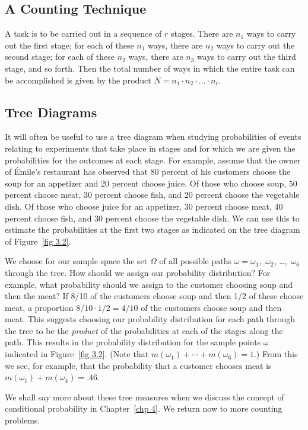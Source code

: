 
\subsection*{A Counting Technique}

A task is to be carried out in a sequence of $r$ stages.  There are $n_1$ ways to
carry out the first stage; for each of these $n_1$ ways, there are $n_2$ ways to carry
out the second stage; for each of these $n_2$ ways, there are
$n_3$ ways to carry out the third stage, and so forth.  Then the total number of ways
in which the entire task can be accomplished is given by the product
$N = n_1 \cdot n_2 \cdot \dots \cdot n_r$.

 
\subsection*{Tree Diagrams}

It will often be useful to use a tree diagram when studying probabilities of events
relating to experiments that take place in stages and for which we are given the
probabilities for the outcomes at each stage.  For example, assume that the owner of
\'Emile's restaurant has observed that 80 percent of his customers choose the soup for
an appetizer and 20 percent choose juice.  Of those who choose soup, 50 percent choose
meat, 30 percent choose fish, and 20 percent choose the vegetable dish.  Of those who
choose juice for an appetizer, 30 percent choose meat, 40 percent choose fish, and 30
percent choose the vegetable dish.  We can use this to estimate the probabilities at
the first two stages as indicated on the tree diagram of Figure~\ref{fig 3.2}.

We choose for our sample space the set $\Omega$ of all possible paths $\omega =
\omega_1$,~$\omega_2$, \dots,~$\omega_6$ through the tree.  How should we assign our
probability distribution?  For example, what probability should we assign to the
customer choosing soup and then the meat?  If 8/10 of the customers choose soup and
then 1/2 of these choose meat, a proportion $8/10 \cdot 1/2 = 4/10$ of the customers
choose soup and then meat.  This suggests choosing our probability distribution for
each path through the tree to be the {\em product} of the probabilities at each of
the stages along the path.  This results in the probability distribution for the sample
points $\omega$ indicated in Figure~\ref{fig 3.2}.  (Note that $m(\omega_1) + \cdots +
m(\omega_6) = 1$.)  From this we see, for example, that the probability that a
customer chooses meat is $m(\omega_1) + m(\omega_4) = .46$.
\par
We shall say more about these tree measures when we discuss the concept of
conditional probability in Chapter~\ref{chp 4}.    We return now to more counting
problems.

